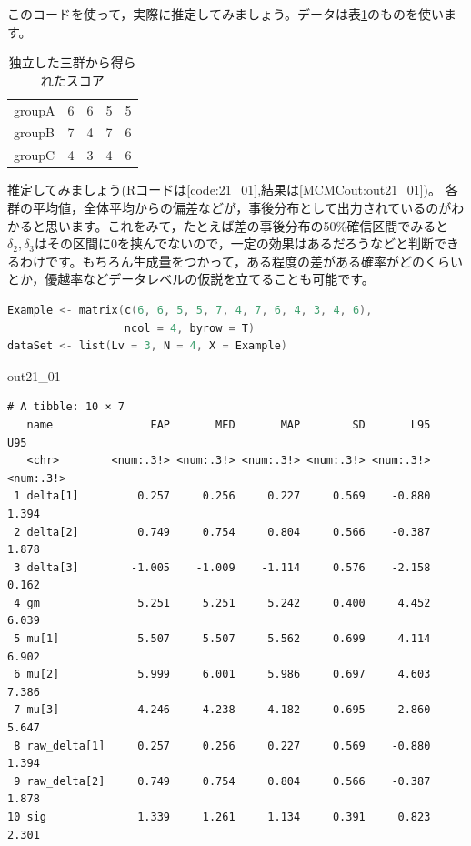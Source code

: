 \documentclass{ltjsbook}
\begin{document}
このコードを使って，実際に推定してみましょう。データは表\ref{tbl::21_01}のものを使います。
\begin{table}[ht]
	\begin{center}
		\caption{独立した三群から得られたスコア}
		\begin{tabular}{l|llll}\hline
			groupA & 6 & 6 & 5 & 5 \\
			groupB & 7 & 4 & 7 & 6 \\
			groupC & 4 & 3 & 4 & 6 \\\hline
		\end{tabular}
		\label{tbl::21_01}
	\end{center}
\end{table}

推定してみましょう(Rコードは\ref{code:21_01},結果は\ref{MCMCout:out21_01})。
各群の平均値，全体平均からの偏差などが，事後分布として出力されているのがわかると思います。これをみて，たとえば差の事後分布の50\%確信区間でみると$\delta_2,\delta_3$はその区間に0を挟んでないので，一定の効果はあるだろうなどと判断できるわけです。もちろん生成量をつかって，ある程度の差がある確率がどのくらいとか，優越率などデータレベルの仮説を立てることも可能です。

\begin{lstlisting}[language=c++,label={code:21_01},caption={三群の平均値の比較}]
Example <- matrix(c(6, 6, 5, 5, 7, 4, 7, 6, 4, 3, 4, 6), 
                  ncol = 4, byrow = T)
dataSet <- list(Lv = 3, N = 4, X = Example)
\end{lstlisting}

\begin{MCMCout}{}{out21_01}
	\begin{verbatim}
# A tibble: 10 × 7
   name               EAP       MED       MAP        SD       L95       U95
   <chr>        <num:.3!> <num:.3!> <num:.3!> <num:.3!> <num:.3!> <num:.3!>
 1 delta[1]         0.257     0.256     0.227     0.569    -0.880     1.394
 2 delta[2]         0.749     0.754     0.804     0.566    -0.387     1.878
 3 delta[3]        -1.005    -1.009    -1.114     0.576    -2.158     0.162
 4 gm               5.251     5.251     5.242     0.400     4.452     6.039
 5 mu[1]            5.507     5.507     5.562     0.699     4.114     6.902
 6 mu[2]            5.999     6.001     5.986     0.697     4.603     7.386
 7 mu[3]            4.246     4.238     4.182     0.695     2.860     5.647
 8 raw_delta[1]     0.257     0.256     0.227     0.569    -0.880     1.394
 9 raw_delta[2]     0.749     0.754     0.804     0.566    -0.387     1.878
10 sig              1.339     1.261     1.134     0.391     0.823     2.301
\end{verbatim}
\end{MCMCout}
\end{document}

